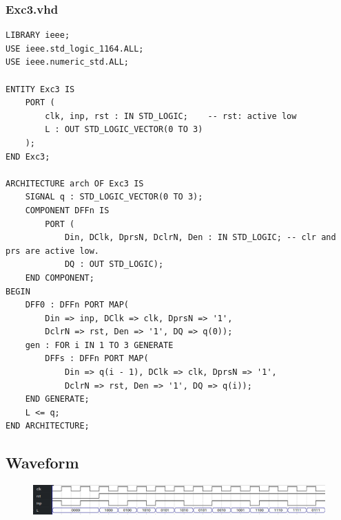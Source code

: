 \documentclass[13pt,a4paper]{report}
\begin{document}
\subsubsection{Exc3.vhd}
\begin{verbatim}
LIBRARY ieee;
USE ieee.std_logic_1164.ALL;
USE ieee.numeric_std.ALL;

ENTITY Exc3 IS
	PORT (
		clk, inp, rst : IN STD_LOGIC;    -- rst: active low
		L : OUT STD_LOGIC_VECTOR(0 TO 3)
	);
END Exc3;

ARCHITECTURE arch OF Exc3 IS
	SIGNAL q : STD_LOGIC_VECTOR(0 TO 3);
	COMPONENT DFFn IS
		PORT (
			Din, DClk, DprsN, DclrN, Den : IN STD_LOGIC; -- clr and prs are active low.
			DQ : OUT STD_LOGIC);
	END COMPONENT;
BEGIN
	DFF0 : DFFn PORT MAP(
		Din => inp, DClk => clk, DprsN => '1',
		DclrN => rst, Den => '1', DQ => q(0));
	gen : FOR i IN 1 TO 3 GENERATE
		DFFs : DFFn PORT MAP(
			Din => q(i - 1), DClk => clk, DprsN => '1',
			DclrN => rst, Den => '1', DQ => q(i));
	END GENERATE;
	L <= q;
END ARCHITECTURE;
\end{verbatim}

\subsection{Waveform}
\begin{figure}[H]
\centering
\includegraphics[scale=0.6]{images/Exc3_waveform.png}
\end{figure}
\end{document}
